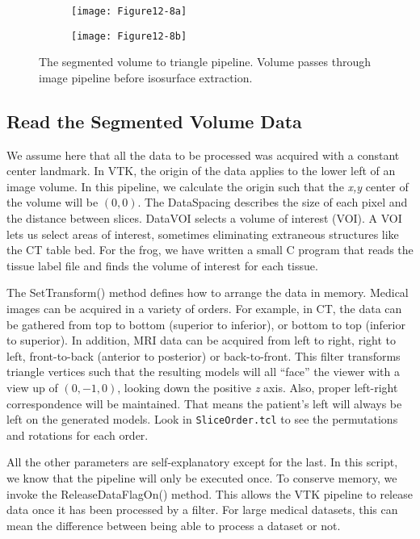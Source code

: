 \begin{figure}[htb]
	\begin{subfigure}[h]{0.48\linewidth}
		\texttt{[image: Figure12-8a]}
		\caption*{}
		\label{fig:Figure12-8a}
	\end{subfigure}
	\hfill
	\begin{subfigure}[h]{0.48\linewidth}
		\texttt{[image: Figure12-8b]}
		\caption*{}
		\label{fig:Figure12-8b}
	\end{subfigure}
	\caption{The segmented volume to triangle pipeline. Volume passes through image pipeline before isosurface extraction.}\label{fig:Figure12-8}
\end{figure}

\subsection{Read the Segmented Volume Data}

We assume here that all the data to be processed was acquired with a constant center landmark. In VTK, the origin of the data applies to the lower left of an image volume. In this pipeline, we calculate the origin such that the \emph{x,y} center of the volume will be $(0,0)$. The DataSpacing describes the size of each pixel and the distance between slices. DataVOI selects a volume of interest (VOI). A VOI lets us select areas of interest, sometimes eliminating extraneous structures like the CT table bed. For the frog, we have written a small C program that reads the tissue label file and finds the volume of interest for each tissue.

The SetTransform() method defines how to arrange the data in memory. Medical images can be acquired in a variety of orders. For example, in CT, the data can be gathered from top to bottom (superior to inferior), or bottom to top (inferior to superior). In addition, MRI data can be acquired from left to right, right to left, front-to-back (anterior to posterior) or back-to-front. This filter transforms triangle vertices such that the resulting models will all ``face'' the viewer with a view up of $(0,-1,0)$, looking down the positive \emph{z} axis. Also, proper left-right correspondence will be maintained. That means the patient's left will always be left on the generated models. Look in \texttt{SliceOrder.tcl} to see the permutations and rotations for each order.

All the other parameters are self-explanatory except for the last. In this script, we know that the pipeline will only be executed once. To conserve memory, we invoke the ReleaseDataFlagOn() method. This allows the VTK pipeline to release data once it has been processed by a filter. For large medical datasets, this can mean the difference between being able to process a dataset or not.


